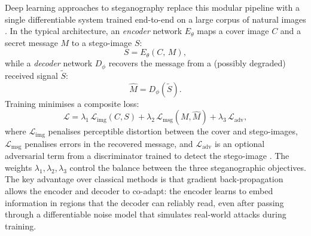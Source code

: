 \documentclass[12pt,a4paper,oneside]{report}
\begin{document}
	Deep learning approaches to steganography replace this modular pipeline with a single
	differentiable system trained end-to-end on a large corpus of natural images
	\cite{zhu2018hidden, baluja2017hiding}. In the typical architecture, an \emph{encoder} network
	$E_\theta$ maps a cover image $C$ and a secret message $M$ to a stego-image $S$:
	\begin{equation}
		S = E_\theta(C,\, M),
		\label{eq:encoder}
	\end{equation}
	while a \emph{decoder} network $D_\phi$ recovers the message from a (possibly degraded) received
	signal $\tilde{S}$:
	\begin{equation}
		\hat{M} = D_\phi(\tilde{S}).
		\label{eq:decoder}
	\end{equation}
	Training minimises a composite loss:
	\begin{equation}
		\mathcal{L} = \lambda_1\,\mathcal{L}_{\text{img}}(C,S)
		+ \lambda_2\,\mathcal{L}_{\text{msg}}(M,\hat{M})
		+ \lambda_3\,\mathcal{L}_{\text{adv}},
		\label{eq:loss}
	\end{equation}
	where $\mathcal{L}_{\text{img}}$ penalises perceptible distortion between the cover and
	stego-images, $\mathcal{L}_{\text{msg}}$ penalises errors in the recovered message, and
	$\mathcal{L}_{\text{adv}}$ is an optional adversarial term from a discriminator trained to
	detect the stego-image \cite{hayes2017}. The weights $\lambda_1, \lambda_2, \lambda_3$
	control the balance between the three steganographic objectives. The key advantage over classical
	methods is that gradient back-propagation allows the encoder and decoder to co-adapt: the encoder
	learns to embed information in regions that the decoder can reliably read, even after passing
	through a differentiable noise model that simulates real-world attacks during training.
	
\end{document}
